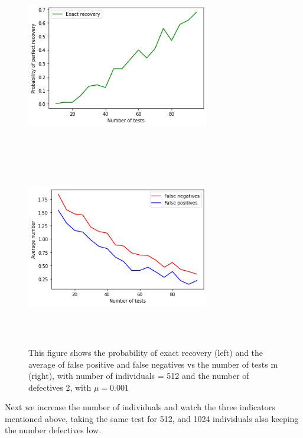 \begin{figure}[H]
	\includegraphics[height=8cm, width=8cm]{images/index1}
	\includegraphics[height=8cm, width=8cm]{images/index}
	\caption{This figure shows the probability of exact recovery (left) and  the average of false positive and false negatives vs the number of tests m (right), with number of individuals  = 512 and the number of defectives 2, with $ \mu = 0.001 $}
	\label{exat}
\end{figure}


Next we increase the number of individuals and watch the three indicators mentioned above, taking the same test for 512, and 1024 individuals also keeping the number defectives low. 

